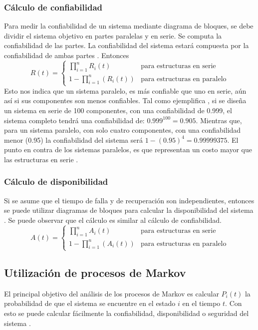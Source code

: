 \subsubsection{Cálculo de confiabilidad}
Para medir la confiabilidad de un sistema mediante diagrama de bloques, se debe dividir el sistema objetivo en  partes paralelas y en serie. Se computa la confiabilidad
de las partes. La confiabilidad del sistema estará compuesta por la confiabilidad de ambas partes \citep{FTDesign}. Entonces
$$R(t) = \left \{
\begin{matrix}
  \prod_{i=1}^{n} R_{i}(t) & \text{para estructuras en serie}\\
  1 - \prod_{i=1}^{n}(R_{i}(t)) & \text{para estructuras en paralelo}
\end{matrix} $$
Esto nos indica que un sistema paralelo, es más confiable que uno en serie, aún así si sus componentes son menos confiables. Tal como ejemplifica \cite{FTDesign}, si se diseña un sistema en serie de 100 componentes, con una confiabilidad de 0.999, el sistema completo tendrá una confiabilidad de:
$0.999^{100} = 0.905$. Mientras que, para un sistema paralelo, con solo cuatro componentes, con una confiabilidad menor (0.95) la confiabilidad del sistema
será $1-(0.95)^4 = 0.99999375$. El punto en contra de los sistemas paralelos, es que representan un costo mayor que las estructuras en serie \citep{FTDesign}.

\subsubsection{Cálculo de disponibilidad}
Si se asume que el tiempo de falla y de recuperación son independientes, entonces se puede utilizar diagramas de bloques para calcular la disponibilidad
del sistema  \citep{FTDesign}.  Se puede observar que el cálculo es similar al cálculo de confiabilidad.
 $$A(t) = \left \{
 \begin{matrix}
   \prod_{i=1}^{n} A_{i}(t) & \text{para estructuras en serie}\\
   1 - \prod_{i=1}^{n}(A_{i}(t)) & \text{para estructuras en paralelo}
 \end{matrix} $$

\subsection{Utilización de procesos de Markov}
El principal objetivo del análisis de los procesos de Markov es calcular $P_i(t)$ la probabilidad de que el sistema se encuentre en el estado $i$
en el tiempo $t$. Con esto se puede calcular fácilmente la confiabilidad, disponibilidad o seguridad del sistema \citep{FTDesign}.

